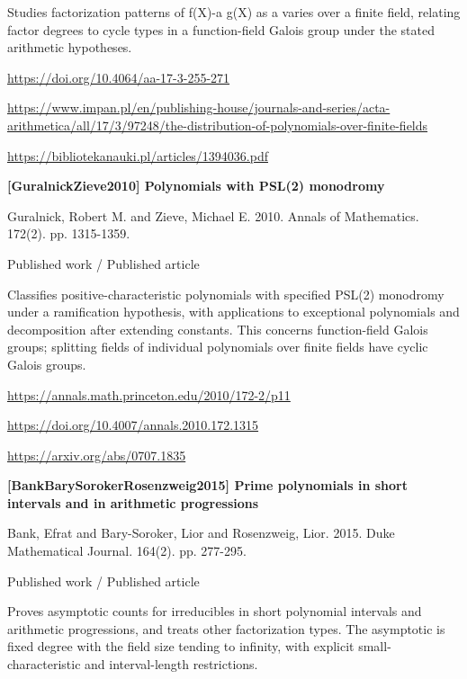 \documentclass[11pt,a4paper,oneside,openany]{book}
\begin{document}
\color{black} Studies factorization patterns of f(X)-a g(X) as a varies over a finite field, relating factor degrees to cycle types in a function-field Galois group under the stated arithmetic hypotheses.\par
{\footnotesize\url{https://doi.org/10.4064/aa-17-3-255-271}}\par
{\footnotesize\url{https://www.impan.pl/en/publishing-house/journals-and-series/acta-arithmetica/all/17/3/97248/the-distribution-of-polynomials-over-finite-fields}}\par
{\footnotesize\url{https://bibliotekanauki.pl/articles/1394036.pdf}}\par
\vspace{9pt}
\hypertarget{ref:GuralnickZieve2010}{}
{\sffamily\bfseries\color{atlasgreen}[GuralnickZieve2010] Polynomials with PSL(2) monodromy}\par
\color{black} Guralnick, Robert M. and Zieve, Michael E. 2010. Annals of Mathematics. 172(2). pp. 1315-1359.\par
{\small\sffamily\color{atlasgold}Published work / Published article}\par
\color{black} Classifies positive-characteristic polynomials with specified PSL(2) monodromy under a ramification hypothesis, with applications to exceptional polynomials and decomposition after extending constants. This concerns function-field Galois groups; splitting fields of individual polynomials over finite fields have cyclic Galois groups.\par
{\footnotesize\url{https://annals.math.princeton.edu/2010/172-2/p11}}\par
{\footnotesize\url{https://doi.org/10.4007/annals.2010.172.1315}}\par
{\footnotesize\url{https://arxiv.org/abs/0707.1835}}\par
\vspace{9pt}
\hypertarget{ref:BankBarySorokerRosenzweig2015}{}
{\sffamily\bfseries\color{atlasgreen}[BankBarySorokerRosenzweig2015] Prime polynomials in short intervals and in arithmetic progressions}\par
\color{black} Bank, Efrat and Bary-Soroker, Lior and Rosenzweig, Lior. 2015. Duke Mathematical Journal. 164(2). pp. 277-295.\par
{\small\sffamily\color{atlasgold}Published work / Published article}\par
\color{black} Proves asymptotic counts for irreducibles in short polynomial intervals and arithmetic progressions, and treats other factorization types. The asymptotic is fixed degree with the field size tending to infinity, with explicit small-characteristic and interval-length restrictions.\par
\end{document}

